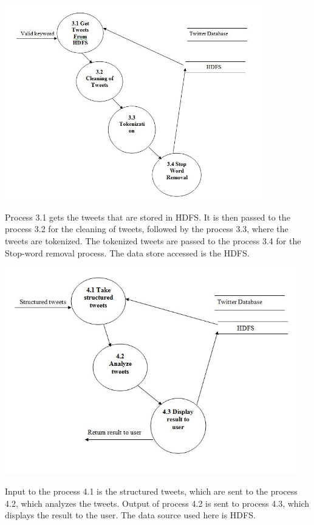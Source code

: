 \documentclass[a4paper,12pt]{report}
\begin{document}
\begin{center}
	\includegraphics[height=8.5cm]{images/level23.jpg}
\end{center}
\hspace*{\parindent}Process 3.1 gets the tweets that are stored in HDFS. It is then passed to the process 3.2 for the cleaning of tweets, followed by the process 3.3, where the tweets are tokenized. The tokenized tweets are passed to the process 3.4 for the Stop-word removal process. The data store accessed is the HDFS.
\begin{center}
	\includegraphics[height=9cm]{images/level24.jpg}
\end{center}
\hspace*{\parindent}Input to the process 4.1 is the structured tweets, which are sent to the process 4.2, which analyzes the tweets. Output of process 4.2 is sent to process 4.3, which displays the result to the user. The data source used here is HDFS.
\end{document}
